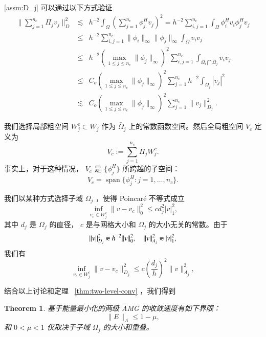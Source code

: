 \documentclass[12pt]{acta_2011xz}
\newcommand{\eqqsim}{\mathbin{\rotatebox[origin=c]{180}{\ensuremath{\cong}}}}
\newcommand{\co}{\ensuremath{C_{o}}}
\newtheorem{theorem}{Theorem}[section]
\begin{document}
   \eqref{assm:D_j}    可以通过以下方式验证
   \begin{eqnarray*}
    \|\sum_{j=1}^{n_c}\Pi_jv_j\|_D^2 &\lesssim &h^{-2}\int_{\Omega}\left(\sum_{j=1}^{n_c}\phi_j^Hv_j\right)^2= h^{-2}\sum_{i,j=1}^{n_c}\int_{\Omega}\phi_i^Hv_i\phi_j^Hv_j \\ 
    &\le & h^{-2}\sum_{i,j=1}^{n_c}\|\phi_i\|_{\infty}\|\phi_j\|_{\infty}\int_{\Omega}v_iv_j \\ 
    &\le & h^{-2}(\max_{1\le j\le n_c}\|\phi_j\|_{\infty})^2\sum_{i, j=1}^{n_c}\int_{\Omega_i\bigcap\Omega_j}v_iv_j \\ 
    &\le &\co(\max_{1\le j\le n_c}\|\phi_j\|_{\infty})^2\sum_{j=1}^{n_c}h^{-2}\int_{\Omega_j}|v_j|^2 \\ 
    &\lesssim &\co(\max_{1\le j\le n_c}\|\phi_j\|_{\infty})^2\sum_{j=1}^{n_c}\|v_j\|_{D_j}^2.
\end{eqnarray*}     

我们选择局部粗空间    $W_j^c\subset W_j$    作为    $\bar\Omega_j$    上的常数函数空间。然后全局粗空间    $V_c$    定义为 
   \begin{equation*}
    V_c:=\sum_{j=1}^{n_c}\Pi_jW_j^c.
\end{equation*}    事实上，对于这种情况，   $V_c$    是    $ \{ \phi_j^H \} $    所跨越的子空间：
   \begin{equation}
    V_c=\operatorname{span} \{ \phi_j^H: j=1, \dots, n_c \} .
\end{equation}     

我们以某种方式选择子域    $\Omega_j$   ，使得 Poincar\'{e} 不等式成立
   \begin{equation*}
    \inf_{v_c\in W_j^c}\|v-v_c\|_0^2\le cd_j^2|v|_1^2,
\end{equation*}    其中    $d_j$    是    $\Omega_j$    的直径，   $c$    是与网格大小和    $\Omega_j$    的大小无关的常数。由于
   \begin{equation*}
    \|v\|_{D_j}^2\eqqsim h^{-2}\|v\|_0^2, \quad  \|v\|_{A_j}^2 \eqqsim |v|_1^2,
\end{equation*}    我们有
   \begin{equation*}
    \inf_{v_c\in W_j^c}\|v-v_c\|_{D_j}^2\le c\left(\frac{d_j}{h}\right)^2\|v\|_{A_j}^2,
\end{equation*}     

结合以上讨论和定理~   \ref{thm:two-level-conv}   ，我们得到
   \begin{theorem}基于能量最小化的两级 AMG 的收敛速度有如下界限：
   \begin{equation}
        \|E\|_A\le 1-\mu,
    \end{equation}    和    $0<\mu<1$    仅取决于子域    $\Omega_j$    的大小和重叠。  \end{theorem}     
\end{document}

